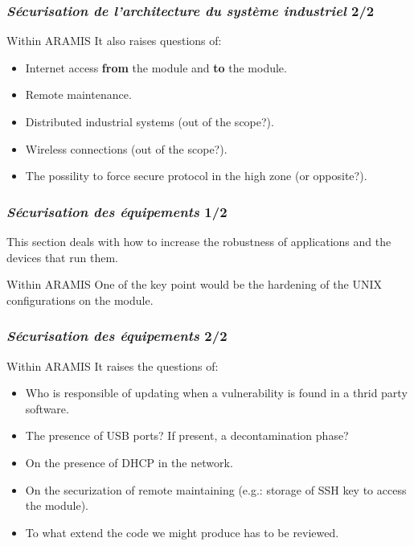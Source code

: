 \documentclass{beamer}
\begin{document}
\begin{frame}
    \frametitle{{\em S\'ecurisation de l'architecture du syst\`eme industriel} 2/2}
    
    \begin{block}{Within ARAMIS}
        It also raises questions of:
        \begin{itemize}
            \item Internet access {\bf from} the module and {\bf to} the module.
            \item Remote maintenance.
            \item Distributed industrial systems (out of the scope?).
            \item Wireless connections (out of the scope?).
            \item The possility to force secure protocol in the high zone (or opposite?).
        \end{itemize}
    \end{block}
\end{frame}

\begin{frame}
    \frametitle{{\em S\'ecurisation des \'equipements} 1/2}

    This section deals with how to increase the robustness of applications and the devices that run them.
    \vfill
    \begin{block}{Within ARAMIS}
        One of the key point would be the hardening of the UNIX configurations on the module.\\
    \end{block}
\end{frame}

\begin{frame}
    \frametitle{{\em S\'ecurisation des \'equipements} 2/2}
    
    \begin{block}{Within ARAMIS}
        It raises the questions of:
        \begin{itemize}
            \item Who is responsible of updating when a vulnerability is found in a thrid party software.
            \item The presence of USB ports? If present, a decontamination phase?
            \item On the presence of DHCP in the network.
            \item On the securization of remote maintaining (e.g.: storage of SSH key to access the module).
            \item To what extend the code we might produce has to be reviewed.
        \end{itemize}
    \end{block}
\end{frame}
\end{document}
